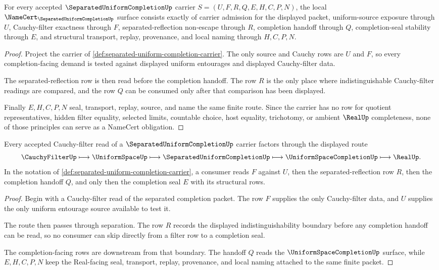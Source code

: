 \begin{theorem}
\label{thm:separated-uniform-completion-namecert-obligations}
For every accepted $\SeparatedUniformCompletionUp$ carrier $S=(U,F,R,Q,E,H,C,P,N)$, the local $\NameCert_{\SeparatedUniformCompletionUp}$ surface consists exactly of carrier admission for the displayed packet, uniform-source exposure through $U$, Cauchy-filter exactness through $F$, separated-reflection non-escape through $R$, completion handoff through $Q$, completion-seal stability through $E$, and structural transport, replay, provenance, and local naming through $H,C,P,N$.
\end{theorem}
\begin{proof}
Project the carrier of \autoref{def:separated-uniform-completion-carrier}. The only source and Cauchy rows are $U$ and $F$, so every completion-facing demand is tested against displayed uniform entourages and displayed Cauchy-filter data.

The separated-reflection row is then read before the completion handoff. The row $R$ is the only place where indistinguishable Cauchy-filter readings are compared, and the row $Q$ can be consumed only after that comparison has been displayed.

Finally $E,H,C,P,N$ seal, transport, replay, source, and name the same finite route. Since the carrier has no row for quotient representatives, hidden filter equality, selected limits, countable choice, host equality, trichotomy, or ambient $\RealUp$ completeness, none of those principles can serve as a NameCert obligation.
\end{proof}

\begin{theorem}
\label{thm:separated-uniform-completion-cauchy-filter-route}
Every accepted Cauchy-filter read of a $\SeparatedUniformCompletionUp$ carrier factors through the displayed route
$$
\CauchyFilterUp \longmapsto \UniformSpaceUp \longmapsto \SeparatedUniformCompletionUp \longmapsto \UniformSpaceCompletionUp \longmapsto \RealUp .
$$
In the notation of \autoref{def:separated-uniform-completion-carrier}, a consumer reads $F$ against $U$, then the separated-reflection row $R$, then the completion handoff $Q$, and only then the completion seal $E$ with its structural rows.
\end{theorem}
\begin{proof}
Begin with a Cauchy-filter read of the separated completion packet. The row $F$ supplies the only Cauchy-filter data, and $U$ supplies the only uniform entourage source available to test it.

The route then passes through separation. The row $R$ records the displayed indistinguishability boundary before any completion handoff can be read, so no consumer can skip directly from a filter row to a completion seal.

The completion-facing rows are downstream from that boundary. The handoff $Q$ reads the $\UniformSpaceCompletionUp$ surface, while $E,H,C,P,N$ keep the Real-facing seal, transport, replay, provenance, and local naming attached to the same finite packet.
\end{proof}

